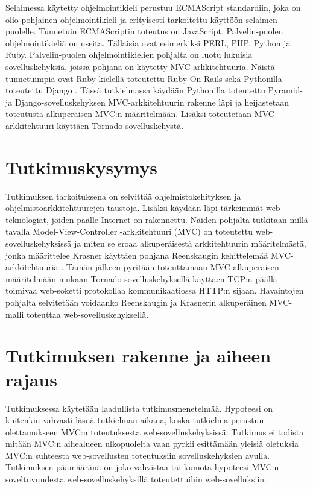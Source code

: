 \documentclass[utf8]{gradu3}
\begin{document}
Selaimessa käytetty ohjelmointikieli perustuu ECMAScript standardiin, joka on olio-pohjainen ohjelmointikieli ja erityisesti tarkoitettu käyttöön selaimen puolelle. Tunnetuin ECMAScriptin toteutus on JavaScript. Palvelin-puolen ohjelmointikieliä on useita. Tällaisia ovat esimerkiksi PERL, PHP, Python ja Ruby. Palvelin-puolen ohjelmointikielien pohjalta on luotu lukuisia sovelluskehyksiä, joissa pohjana on käytetty MVC-arkkitehtuuria. Näistä tunnetuimpia ovat Ruby-kielellä toteutettu Ruby On Rails sekä Pythonilla toteutettu Django \parencite{trends}. Tässä tutkielmassa käydään Pythonilla toteutettu Pyramid- ja Django-sovelluskehyksen MVC-arkkitehtuurin rakenne läpi ja heijastetaan toteutusta alkuperäisen MVC:n määritelmään. Lisäksi toteutetaan MVC-arkkitehtuuri käyttäen Tornado-sovelluskehystä.

\section{Tutkimuskysymys}
Tutkimuksen tarkoituksena on selvittää ohjelmistokehityksen ja ohjelmistoarkkitehtuurejen taustoja. Lisäksi käydään läpi tärkeimmät web-teknologiat, joiden päälle Internet on rakennettu.  Näiden pohjalta tutkitaan millä tavalla 
Model-View-Controller -arkkitehtuuri (MVC) on toteutettu web-sovelluskehyksissä ja miten se
eroaa alkuperäisestä arkkitehtuurin määritelmästä, jonka määrittelee Krasner \parencite{krasner} käyttäen pohjana Reenskaugin kehittelemää MVC-arkkitehtuuria \parencite{reenskaug_tools} . Tämän jälkeen pyritään toteuttamaan MVC alkuperäisen
määritelmään mukaan Tornado-sovelluskehyksellä käyttäen TCP:n päällä toimivaa web-soketti protokollaa kommunikaatiossa HTTP:n sijaan. Havaintojen pohjalta
selvitetään voidaanko Reenskaugin ja Krasnerin alkuperäinen MVC-malli toteuttaa web-sovelluskehyksellä. 

\section{Tutkimuksen rakenne ja aiheen rajaus}
Tutkimuksessa käytetään laadullista tutkimusmenetelmää. Hypoteesi on kuitenkin vahvasti läsnä tutkielman aikana, koska tutkielma perustuu olettamukseen MVC:n toteutuksesta web-sovelluskehyksissä. Tutkimus ei todista mitään MVC:n aihealueen ulkopuolelta vaan pyrkii esittämään yleisiä oletuksia 
MVC:n suhteesta web-sovellusten toteutuksiin sovelluskehyksien avulla. Tutkimuksen päämääränä on joko vahvistaa tai kumota hypoteesi MVC:n soveltuvuudesta web-sovelluskehyksillä toteutettuihin web-sovelluksiin. 
\end{document}
